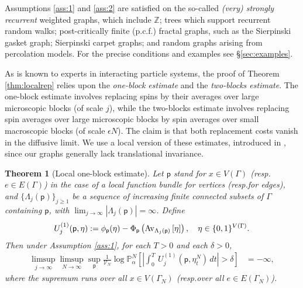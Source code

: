 \documentclass[11pt]{amsart}
\theoremstyle{plain}
\newtheorem{theorem}{Theorem}
\theoremstyle{definition}
\theoremstyle{remark}
\begin{document}
Assumptions \ref{ass:1} and \ref{ass:2} are satisfied on the so-called \emph{(very) strongly recurrent} weighted graphs, which include $\mathbb{Z}$; trees which support recurrent random walks; post-critically finite (p.c.f.\@) fractal graphs, such as the Sierpinski gasket graph; Sierpinski carpet graphs; and random graphs arising from percolation models. For the precise conditions and examples see \S\ref{sec:examples}.

As is known to experts in interacting particle systems, the proof of Theorem \ref{thm:localrep} relies upon the \emph{one-block estimate} and the \emph{two-blocks estimate}. The one-block estimate involves replacing spins by their averages over large microscopic blocks (of scale $j$), while the two-blocks estimate involves replacing spin averages over large microscopic blocks by spin averages over small macroscopic blocks (of scale $\epsilon N$). The claim is that both replacement costs vanish in the diffusive limit. We use a local version of these estimates, introduced in \cite{JLSLocal}, since our graphs generally lack translational invariance.

\begin{theorem}[Local one-block estimate]
\label{thm:1block}
Let ${\mathsf{p}}$ stand for $x\in V(\Gamma)$ (resp.\@ $e\in E(\Gamma)$) in the case of a local function bundle for vertices (resp.\@ for edges), and $\{\Lambda_j({\mathsf{p}})\}_{j\geq 1}$ be a sequence of increasing finite connected subsets of $\Gamma$ containing ${\mathsf{p}}$, with $\lim_{j\to\infty} |\Lambda_j({\mathsf{p}})|=\infty$. Define
\begin{equation}
{U^{(1)}_{{{j}}}}({\mathsf{p}},\eta)  := \phi_{\mathsf{p}}(\eta) - \Phi_{\mathsf{p}}\left({{\rm Av}_{{\Lambda_j({\mathsf{p}})}}\left[{{\eta}}\right]}\right), \quad \eta\in \{0,1\}^{V(\Gamma)}.
\end{equation}
Then under Assumption \ref{ass:1}, for each $T>0$ and each $\delta>0$,
\begin{align}
\label{1bp} \limsup_{j\to\infty} \limsup_{N\to\infty} \sup_{\mathsf{p}} \frac{1}{\mathcal{V}_N} \log \mathbb{P}^N_\alpha \left[\left|\int_0^T \, {U^{(1)}_{{{j}}}}({\mathsf{p}},\eta^N_t)\,dt\right|>\delta\right] &=-\infty,
\end{align}
where the supremum runs over all $x\in V(\Gamma_N)$ (resp.\@ over all $e\in E(\Gamma_N)$).
\end{theorem}
\end{document}
